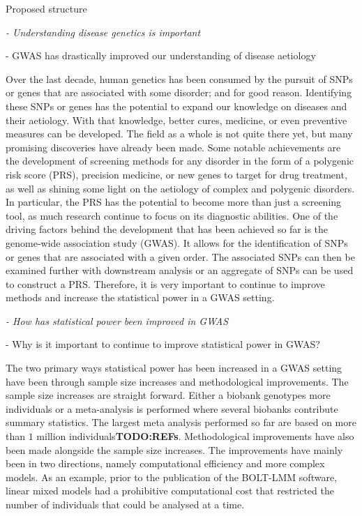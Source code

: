 Proposed structure

{\itshape
- Understanding disease genetics is important

- GWAS has drastically improved our understanding of disease aetiology}

Over the last decade, human genetics has been consumed by the pursuit of SNPs or genes that are associated with some disorder; and 
for good reason. Identifying these SNPs or genes has the potential to expand our knowledge on diseases and their aetiology. With that
knowledge, better cures, medicine, or even preventive measures can be developed. The field as a whole is not quite there yet, but many 
promising discoveries have already been made. Some notable achievements are the development of screening methods for any disorder in 
the form of a polygenic risk score (PRS), precision medicine, or new genes to target for drug treatment, as well as shining some light 
on the aetiology of complex and polygenic disorders. In particular, the PRS has the potential to become more than just a screening 
tool, as much research continue to focus on its diagnostic abilities. One of the driving factors behind the development that has been 
achieved so far is the genome-wide association study (GWAS). It allows for the identification of SNPs or genes that are associated 
with a given order. The associated SNPs can then be examined further with downstream analysis or an aggregate of SNPs can be used to 
construct a PRS. Therefore, it is very important to continue to improve methods and increase the statistical power in a GWAS setting.



{\itshape
	- How has statistical power been improved in GWAS 
	
	- Why is it important to continue to improve statistical power in GWAS?
}

The two primary ways statistical power has been increased in a GWAS setting have been through sample size increases and methodological improvements. The sample size increases are straight forward. Either a biobank genotypes more individuals or a meta-analysis is performed where several biobanks contribute summary statistics. The largest meta analysis performed so far are based on more than $ 1 $ million individuals\textbf{TODO:REFs}. Methodological improvements have also been made alongside the sample size increases. The improvements have mainly been in two directions, namely computational efficiency and more complex models. As an example, prior to the publication of the BOLT-LMM\cite{loh2015efficient} software, linear mixed models had a prohibitive computational cost that restricted the number of individuals that could be analysed at a time.%

